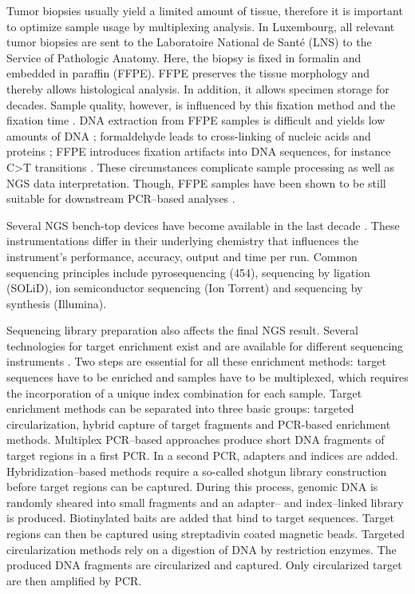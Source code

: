 {{{      Tumor biopsies usually yield a limited amount of tissue, therefore it is
      important to optimize sample usage by multiplexing analysis. In
      Luxembourg, all relevant tumor biopsies are sent to the
      Laboratoire National de Santé (LNS) to the Service of Pathologic Anatomy.
      Here, the biopsy is fixed in formalin and embedded in paraffin (FFPE).
      FFPE preserves the tissue morphology and thereby allows histological
      analysis. In addition, it allows specimen storage for decades. Sample
      quality, however, is influenced by this fixation method and the fixation
      time {\cite{implementation}}. DNA extraction from FFPE samples is difficult and yields low amounts
      of DNA {\cite{ffpe_ngs_2}}; formaldehyde leads to cross-linking of nucleic acids and proteins {\cite{ffpe_ngs_3}};
      FFPE introduces fixation artifacts into DNA sequences, for instance C>T
      transitions {\cite{ffpe_ngs_4}}. These circumstances complicate sample processing as well as
      NGS data interpretation. Though, FFPE samples have been shown to be still
      suitable for downstream PCR--based analyses {\cite{ffpe_ngs_5}}.

      Several NGS bench-top devices have become available in the last decade {\cite{devices}}.
      These instrumentations differ in their underlying chemistry that
      influences the instrument’s performance, accuracy, output and time per
      run. Common sequencing principles include pyrosequencing (454), sequencing
      by ligation (SOLiD), ion semiconductor sequencing (Ion Torrent) and
      sequencing by synthesis (Illumina).

      Sequencing library preparation also affects the final NGS result. Several
      technologies for target enrichment exist and are available for different
      sequencing instruments {\cite{library}}. Two steps are essential for all these enrichment
      methods: target sequences have to be enriched and samples have to be
      multiplexed, which requires the incorporation of a unique index
      combination for each sample. Target enrichment methods can be separated
      into three basic groups: targeted circularization, hybrid capture of
      target fragments and PCR-based enrichment methods. Multiplex PCR--based
      approaches produce short DNA fragments of target regions in a first PCR.
      In a second PCR, adapters and indices are added. Hybridization--based
      methods require a so-called shotgun library construction before target
      regions can be captured. During this process, genomic DNA is randomly
      sheared into small fragments and an adapter-- and index--linked library is
      produced. Biotinylated baits are added that bind to target sequences.
      Target regions can then be captured using streptadivin coated magnetic
      beads. Targeted circularization methods rely on a digestion of DNA by
      restriction enzymes. The produced DNA fragments are circularized and
      captured. Only circularized target are then amplified by PCR.

}}}
